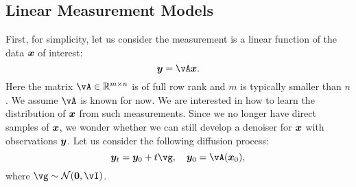 \documentclass[../../book-main.tex]{subfiles}
\begin{document}


\subsection{Linear Measurement Models}
First, for simplicity, let us consider the measurement is a linear function of the data $\bm{x}$ of interest:
\begin{equation}
    \y = \vA\x.
\end{equation}
Here the matrix $\vA \in \mathbb{R}^{m\times n}$ is of full row rank and $m$ is typically smaller than $n$. We assume $\vA$ is known for now. We are interested in how to learn the distribution of $\bm{x}$ from such measurements. Since we no longer have direct samples of $\bm{x}$, we wonder whether we can still develop a denoiser for $\bm{x}$ with observations $\bm{y}$. Let us consider the following diffusion process:
\begin{equation}
    \y_t = \y_0 + t \vg, \quad \y_0 = \vA(\x_0), 
\end{equation}
where $\vg \sim \mathcal{N}(\boldsymbol{0}, \vI)$. 
\end{document}
